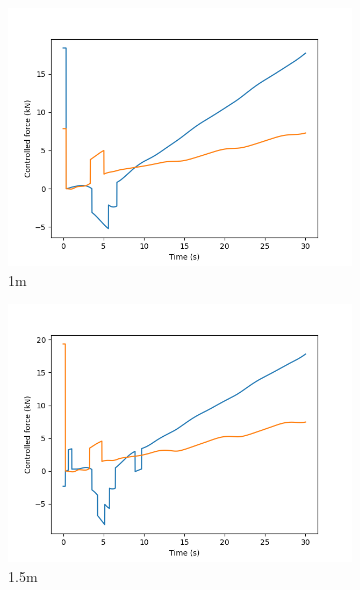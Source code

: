 \documentclass[class=article, crop=false]{standalone}
\begin{document}
\begin{figure}
\begin{subfigure}[b]{0.48\textwidth}
        \includegraphics{scenario1/rov-50m/1.0m/usv_forces}
        \caption{1m}
        \label{}
    \end{subfigure}
    \hfill
    \begin{subfigure}[b]{0.48\textwidth}
        \centering
        \includegraphics{scenario1/rov-50m/1.5m/usv_forces}
        \caption{1.5m}
        \label{}
    \end{subfigure}
    \vfill
    \begin{subfigure}[b]{0.48\textwidth}
        \centering

\end{subfigure}
\end{figure}
\end{document}
